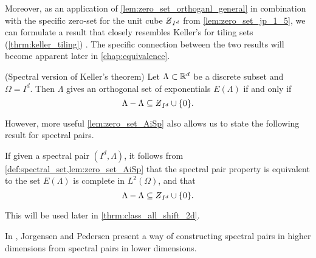 \documentclass[../thesis.tex]{subfiles}
\begin{document}
Moreover, as an application of \cref{lem:zero_set_orthoganl_general} in combination with the specific zero-set for the unit cube $\Zstroke_{I^d}$ from \cref{lem:zero_set_jp_1_5}, we can formulate a result that closely resembles Keller's  for tiling sets (\cref{thrm:keller_tiling}) \cite{lagariasOrthonormalBasesExponentials2000,jorgensenSpectralPairsCartesian2001}. The specific connection between the two results will become apparent later in \cref{chap:equivalence}.
\begin{lemma}(Spectral version of Keller's theorem)\label{lem:zero_set_AiSp}
    Let $\Lambda\subset \mathbb{R}^d$ be a discrete subset and $\Omega=I^d$. Then $\Lambda$ gives an orthogonal set of exponentials $E(\Lambda)$ if and only if
    \begin{equation*}%
        \Lambda - \Lambda \subseteq \Zstroke_{I^d} \cup \braq{0}.
    \end{equation*} 
\end{lemma}

However, more useful \cref{lem:zero_set_AiSp} also allows us to state the following result for spectral pairs. 
\begin{remark}\label{rem:zero_set_orthogonal}  %
    If given a spectral pair $(I^d,\Lambda)$, it follows from \cref{def:spectral_set,lem:zero_set_AiSp} that the spectral pair property is equivalent to the set $E(\Lambda)$ is complete in $L^2(\Omega)$, and that
    \begin{equation*}%
        \Lambda - \Lambda \subseteq \Zstroke_{I^d} \cup \braq{0}.
    \end{equation*}
\end{remark}

This  will be used later in \cref{thrm:class_all_shift_2d}.

In \cite{jorgensenSpectralPairsCartesian2001}, Jorgensen and Pedersen present a way of constructing spectral pairs in higher dimensions from spectral pairs in lower dimensions. 
\end{document}
